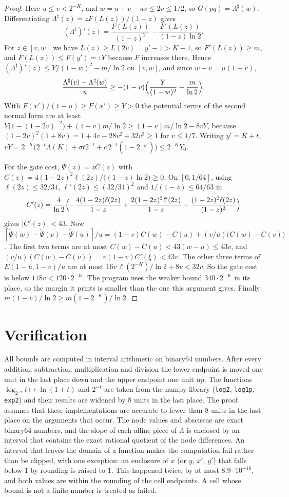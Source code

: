 \documentclass[11pt]{amsart}
\theoremstyle{remark}
\begin{document}
\begin{proof}
Here $u\le v<2^{-K}$, and $w=u+v-uv\le2v\le1/2$, so $G(pq)=\Lambda^\sharp(w)$. Differentiating $\Lambda^\sharp(z)=zF(L(z))/(1-z)$ gives
\[
(\Lambda^\sharp)'(z)=\frac{F(L(z))}{(1-z)^2}-\frac{F'(L(z))}{(1-z)\ln2}.
\]
For $z\in[v,w]$ we have $L(z)\ge L(2v)=y'-1>K-1$, so $F'(L(z))\ge m$, and $F(L(z))\le F(y')=:Y$ because $F$ increases there. Hence $(\Lambda^\sharp)'(z)\le Y/(1-w)^2-m/\ln2$ on $[v,w]$, and since $w-v=u(1-v)$,
\[
\frac{\Lambda^\sharp(v)-\Lambda^\sharp(w)}{u}\ge-(1-v)\Bigl(\frac{Y}{(1-w)^2}-\frac{m}{\ln2}\Bigr).
\]
With $F(x')/(1-u)\ge F(x')\ge Y>0$ the potential terms of the second normal form are at least $Y\bigl(1-(1-2v)^{-2}\bigr)+(1-v)m/\ln2\ge(1-v)m/\ln2-8vY$, because $(1-2v)^2(1+8v)=1+4v-28v^2+32v^3\ge1$ for $v\le1/7$. Writing $y'=K+t$, $vY=2^{-K}\bigl(2^{-t}\Lambda(K)+\sigma t2^{-t}+c\,2^{-t}(1-2^{-y'})\bigr)\le2^{-K}Y_0$.

For the gate cost, $\widetilde\Psi(z)=zC(z)$ with $C(z)=4(1-2z)^2\ell(2z)/\bigl((1-z)\ln2\bigr)\ge0$. On $[0,1/64]$, using $\ell(2z)\le32/31$, $\ell'(2z)\le(32/31)^2$ and $1/(1-z)\le64/63$ in
\[
C'(z)=\frac{4}{\ln2}\Bigl(-\frac{4(1-2z)\ell(2z)}{1-z}+\frac{2(1-2z)^2\ell'(2z)}{1-z}+\frac{(1-2z)^2\ell(2z)}{(1-z)^2}\Bigr)
\]
gives $|C'(z)|<43$. Now $[\widetilde\Psi(w)-\widetilde\Psi(v)-\widetilde\Psi(u)]/u=(1-v)C(w)-C(u)+(v/u)\bigl(C(w)-C(v)\bigr)$. The first two terms are at most $C(w)-C(u)<43(w-u)\le43v$, and $(v/u)(C(w)-C(v))=v(1-v)C'(\xi)<43v$. The other three terms of $E(1-u,1-v)/u$ are at most $16v\,\ell(2^{-K})/\ln2+8v<32v$. So the gate cost is below $118v<120\cdot2^{-K}$. The program uses the weaker bound $340\cdot2^{-K}$ in its place, so the margin it prints is smaller than the one this argument gives. Finally $m(1-v)/\ln2\ge m(1-2^{-K})/\ln2$.
\end{proof}

\section{Verification}\label{sec:verification}

All bounds are computed in interval arithmetic on binary64 numbers. After every addition, subtraction, multiplication and division the lower endpoint is moved one unit in the last place down and the upper endpoint one unit up. The functions $\log_2$, $t\mapsto\ln(1+t)$ and $2^{-t}$ are taken from the numpy library (\texttt{log2}, \texttt{log1p}, \texttt{exp2}) and their results are widened by $8$ units in the last place. The proof assumes that these implementations are accurate to fewer than $8$ units in the last place on the arguments that occur. The node values and abscissae are exact binary64 numbers, and the slope of each affine piece of $\Lambda$ is enclosed by an interval that contains the exact rational quotient of the node differences. An interval that leaves the domain of a function makes the computation fail rather than be clipped, with one exception: an enclosure of $x$ (or $y$, $x'$, $y'$) that falls below $1$ by rounding is raised to $1$. This happened twice, by at most $8.9\cdot10^{-16}$, and both values are within the rounding of the cell endpoints. A cell whose bound is not a finite number is treated as failed.
\end{document}

